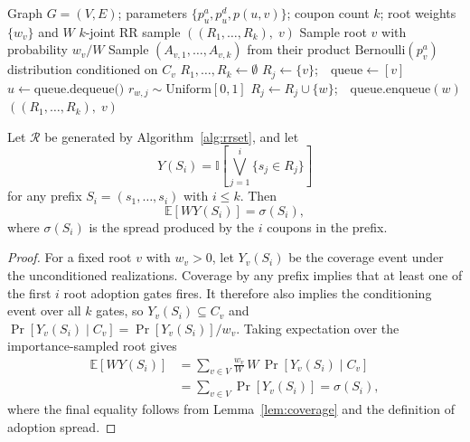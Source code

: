 \documentclass[sigconf,balance=false]{acmart}
\newcommand{\E}{\mathbb{E}}
\newcommand{\I}{\mathbb{I}}
\begin{document}
\begin{algorithm}[t]
\caption{Conditioned $k$-Joint RR Sample Generation}
\label{alg:rrset}
\begin{algorithmic}[1]
\Require Graph $G=(V,E)$; parameters $\{p_u^a, p_u^d, p(u,v)\}$;
  coupon count $k$; root weights $\{w_v\}$ and $W$
\Ensure $k$-joint RR sample $((R_1,\ldots,R_k),\; v)$
\State Sample root $v$ with probability $w_v/W$
\State Sample $(A_{v,1},\ldots,A_{v,k})$ from their product
  $\mathrm{Bernoulli}(p_v^a)$ distribution conditioned on $C_v$
\State $R_1, \ldots, R_k \gets \emptyset$
    \State $R_j \gets \{v\}$;\ \ $\text{queue} \gets [v]$
      \State $u \gets \text{queue.dequeue()}$
            \State $r_{w,j} \sim \mathrm{Uniform}[0,1]$
          \EndIf
            \State $R_j \gets R_j \cup \{w\}$;\ \
              $\text{queue.enqueue}(w)$
          \EndIf
        \EndIf
      \EndFor
    \EndWhile
  \EndIf
\EndFor
\State \Return $((R_1, \ldots, R_k),\; v)$
\end{algorithmic}
\end{algorithm}

\begin{lemma}
\label{lem:importance}
Let $\mathcal{R}$ be generated by Algorithm~\ref{alg:rrset}, and let
\[
  Y(S_i)=\I\!\left[\bigvee_{j=1}^i\{s_j\in R_j\}\right]
\]
for any prefix $S_i=(s_1,\ldots,s_i)$ with $i\leq k$.
Then
\[
  \E[W Y(S_i)]=\sigma(S_i),
\]
where $\sigma(S_i)$ is the spread produced by the $i$ coupons in the
prefix.
\end{lemma}

\begin{proof}
For a fixed root $v$ with $w_v>0$, let $Y_v(S_i)$ be the coverage event
under the unconditioned realizations.
Coverage by any prefix implies that at least one of the first $i$ root
adoption gates fires. It therefore also implies the conditioning event over
all $k$ gates, so
$Y_v(S_i)\subseteq C_v$ and
$\Pr[Y_v(S_i)\mid C_v]=\Pr[Y_v(S_i)]/w_v$.
Taking expectation over the importance-sampled root gives
\begin{align*}
  \E[W Y(S_i)]
  &=\sum_{v\in V}\frac{w_v}{W}\,W\,
    \Pr[Y_v(S_i)\mid C_v]\\
  &=\sum_{v\in V}\Pr[Y_v(S_i)]
   =\sigma(S_i),
\end{align*}
where the final equality follows from Lemma~\ref{lem:coverage} and the
definition of adoption spread.
\end{proof}
\end{document}
